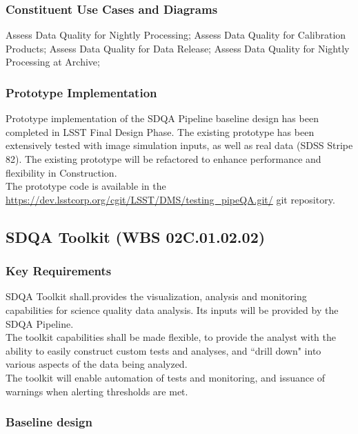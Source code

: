 \documentclass[12pt]{article}
\newcommand{\wbsSDQAT}{WBS 02C.01.02.02}
\begin{document}
\subsubsection{Constituent Use Cases and Diagrams}

Assess Data Quality for Nightly Processing;
Assess Data Quality for Calibration Products;
Assess Data Quality for Data Release;
Assess Data Quality for Nightly Processing at Archive;

\subsubsection{Prototype Implementation}

Prototype implementation of the SDQA Pipeline baseline design has been completed in LSST Final Design Phase. The existing prototype has been extensively tested with image simulation inputs, as well as real data (SDSS Stripe 82). The existing prototype will be refactored to enhance performance and flexibility in Construction.
\\

The prototype code is available in the \url{https://dev.lsstcorp.org/cgit/LSST/DMS/testing_pipeQA.git/} git repository.

\clearpage

\subsection{SDQA Toolkit (\wbsSDQAT)}

\subsubsection{Key Requirements}

SDQA Toolkit shall.provides the visualization, analysis and monitoring capabilities for science quality data analysis. Its inputs will be provided by the SDQA Pipeline.
\\

The toolkit capabilities shall be made flexible, to provide the analyst with the ability to easily construct custom tests and analyses, and ``drill down" into various aspects of the data being analyzed.
\\

The toolkit will enable automation of tests and monitoring, and issuance of warnings when alerting thresholds are met.

\subsubsection{Baseline design}
\end{document}
